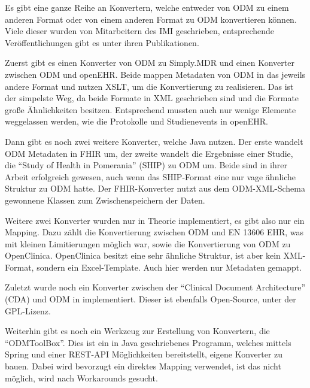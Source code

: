 



	




Es gibt eine ganze Reihe an Konvertern, welche entweder von ODM zu einem anderen Format oder von einem anderen Format zu ODM konvertieren können.
Viele dieser wurden von Mitarbeitern des IMI geschrieben, entsprechende Veröffentlichungen gibt es unter ihren Publikationen.

Zuerst gibt es einen Konverter von ODM zu Simply.MDR \cite{odm2mdr} und einen Konverter zwischen ODM und openEHR\cite{odm2openehr}.
Beide mappen Metadaten von ODM in das jeweils andere Format und nutzen XSLT, um die Konvertierung zu realisieren.
Das ist der simpelste Weg, da beide Formate in XML geschrieben sind und die Formate große Ähnlichkeiten besitzen.
Entsprechend mussten auch nur wenige Elemente weggelassen werden, wie die Protokolle und Studienevents in openEHR.

Dann gibt es noch zwei weitere Konverter, welche Java nutzen. Der erste wandelt ODM Metadaten in FHIR \cite{odm2fhir} um, der zweite wandelt die Ergebnisse einer Studie, die \enquote{Study of Health in Pomerania} (SHIP) zu ODM um\cite{ship2odm}.
Beide sind in ihrer Arbeit erfolgreich gewesen, auch wenn das SHIP-Format eine nur vage ähnliche Struktur zu ODM hatte.
Der FHIR-Konverter nutzt aus dem ODM-XML-Schema gewonnene Klassen zum Zwischenspeichern der Daten.

Weitere zwei Konverter wurden nur in Theorie implementiert, es gibt also nur ein Mapping.
Dazu zählt die Konvertierung zwischen ODM und EN 13606 EHR\cite{odm2ehr}, was mit kleinen Limitierungen möglich war, sowie die Konvertierung von ODM zu OpenClinica\cite{odm2oc}.
OpenClinica besitzt eine sehr ähnliche Struktur, ist aber kein XML-Format, sondern ein Excel-Template.
Auch hier werden nur Metadaten gemappt.

Zuletzt wurde noch ein Konverter zwischen der \enquote{Clinical Document Architecture} (CDA) und ODM in  implementiert\cite{odm2cda}.
Dieser ist ebenfalls Open-Source, unter der GPL-Lizenz.

Weiterhin gibt es noch ein Werkzeug zur Erstellung von Konvertern, die \enquote{ODMToolBox}\cite{odmtoolbox}.
Dies ist ein in Java geschriebenes Programm, welches mittels Spring und einer REST-API Möglichkeiten bereitstellt, eigene Konverter zu bauen.
Dabei wird bevorzugt ein direktes Mapping verwendet, ist das nicht möglich, wird nach Workarounds gesucht.
